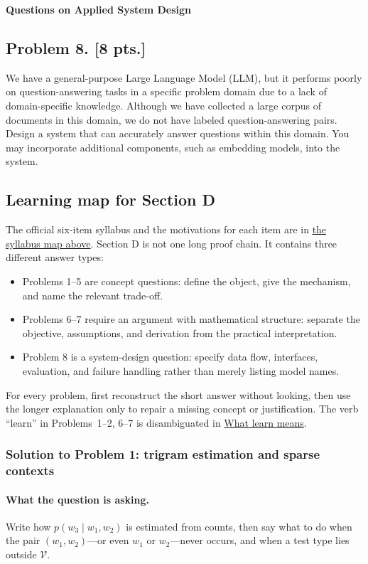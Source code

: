 \documentclass[11pt,a4paper]{article}
\newcommand{\jump}[2]{\hyperref[#1]{#2}}
\theoremstyle{definition}
\begin{document}
\noindent\textbf{Questions on Applied System Design}

\subsection{Problem 8. [8 pts.]}\label{prob:spr2025-nlp-8}
We have a general-purpose Large Language Model (LLM), but it performs poorly on question-answering tasks in a specific problem domain due to a lack of domain-specific knowledge. Although we have collected a large corpus of documents in this domain, we do not have labeled question-answering pairs. Design a system that can accurately answer questions within this domain. You may incorporate additional components, such as embedding models, into the system.

\subsection{Learning map for Section D}

The official six-item syllabus and the motivations for each item are in \jump{sec:spr2025-nlp-syllabus}{the syllabus map above}. Section D is not one long proof chain. It contains three different answer types:

\begin{itemize}
    \item Problems 1--5 are concept questions: define the object, give the mechanism, and name the relevant trade-off.
    \item Problems 6--7 require an argument with mathematical structure: separate the objective, assumptions, and derivation from the practical interpretation.
    \item Problem 8 is a system-design question: specify data flow, interfaces, evaluation, and failure handling rather than merely listing model names.
\end{itemize}

For every problem, first reconstruct the short answer without looking, then use the longer explanation only to repair a missing concept or justification. The verb ``learn'' in Problems~1--2, 6--7 is disambiguated in \jump{sec:spr2025-learn}{What learn means}.

\subsubsection{Solution to Problem 1: trigram estimation and sparse contexts}

\paragraph{What the question is asking.}
Write how \(p(w_3\mid w_1,w_2)\) is estimated from counts, then say what to do when the pair \((w_1,w_2)\)---or even \(w_1\) or \(w_2\)---never occurs, and when a test type lies outside \(\mathcal{V}\).
\end{document}
